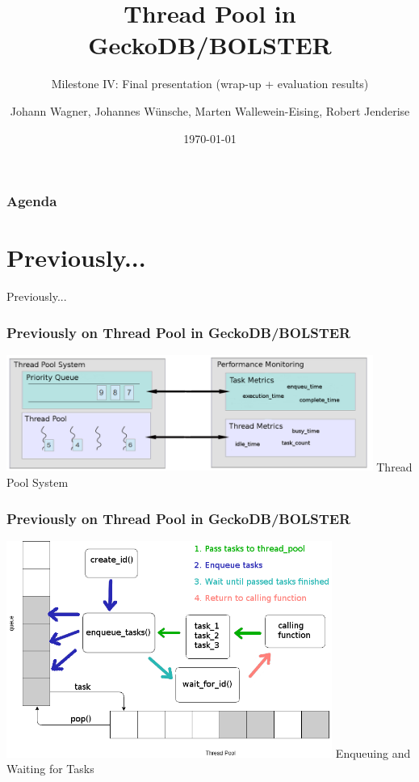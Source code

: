 \documentclass{beamer}
\title{Thread Pool in GeckoDB/BOLSTER}
\subtitle{Milestone IV: Final presentation (wrap-up + evaluation results) }
\author{Johann Wagner, Johannes Wünsche, Marten Wallewein-Eising, Robert Jenderise}
\date{\today}
\institute{Otto von Guericke University, Magdeburg}
\begin{document}
\begin{frame}[plain]
 \titlepage
\end{frame}

\section[Agenda]{}
	\begin{frame}
	\frametitle{Agenda}
	\tableofcontents
	\end{frame}

\section{Previously...}
\begin{frame}
	\begin{center}
		\huge Previously...
	\end{center}
\end{frame}

\begin{frame}
	\frametitle{Previously on Thread Pool in GeckoDB/BOLSTER}
	\begin{center}
		\includegraphics[width=0.9\textwidth]{img/pool_structure.png}
		Thread Pool System
	\end{center}
\end{frame}

\begin{frame}
	\frametitle{Previously on Thread Pool in GeckoDB/BOLSTER}
	\begin{center}
		\includegraphics[width=0.8\textwidth]{img/pool_queue.png}
		Enqueuing and Waiting for Tasks
	\end{center}
\end{frame}
\end{document}
